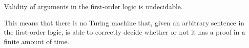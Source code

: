 \begin{theorem}
    Validity of arguments in the first-order logic is undecidable.

    This means that there is no Turing machine that,
    given an arbitrary sentence in the first-order logic,
    is able to correctly decide whether or not it has a proof in a finite amount of time.
\end{theorem}

%     


